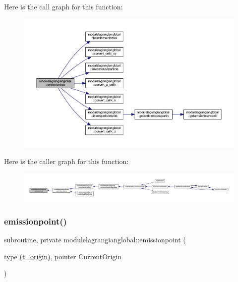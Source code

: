 Here is the call graph for this function\+:\nopagebreak
\begin{figure}[H]
\begin{center}
\leavevmode
\includegraphics[width=350pt]{namespacemodulelagrangianglobal_ad983b6fdc70e80cc81cd4c13a69b7f1f_cgraph}
\end{center}
\end{figure}
Here is the caller graph for this function\+:\nopagebreak
\begin{figure}[H]
\begin{center}
\leavevmode
\includegraphics[width=350pt]{namespacemodulelagrangianglobal_ad983b6fdc70e80cc81cd4c13a69b7f1f_icgraph}
\end{center}
\end{figure}
\mbox{\label{namespacemodulelagrangianglobal_a9d524fab1163e87ac878a520ae670bf9}} 
\subsubsection{\texorpdfstring{emissionpoint()}{emissionpoint()}}
{\footnotesize\ttfamily subroutine, private modulelagrangianglobal\+::emissionpoint (\begin{DoxyParamCaption}\item[{type (\mbox{\hyperlink{structmodulelagrangianglobal_1_1t__origin}{t\+\_\+origin}}), pointer}]{Current\+Origin }\end{DoxyParamCaption})\hspace{0.3cm}{\ttfamily [private]}}

